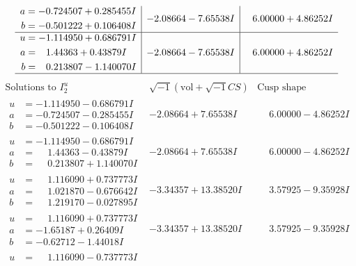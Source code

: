 \documentclass[1p]{elsarticle_modified}
\theoremstyle{definition}
\newcommand{\I}{\sqrt{-1}}
\begin{document}
$$\begin{array}{c|c|c}
\begin{aligned}
a &= -0.724507 + 0.285455 I \\
b &= -0.501222 + 0.106408 I\end{aligned}
 & -2.08664 - 7.65538 I & \phantom{-}6.00000 + 4.86252 I \\ \hline\begin{aligned}
u &= -1.114950 + 0.686791 I \\
a &= \phantom{-}1.44363 + 0.43879 I \\
b &= \phantom{-}0.213807 - 1.140070 I\end{aligned}
 & -2.08664 - 7.65538 I & \phantom{-}6.00000 + 4.86252 I\\
 \hline 
 \end{array}$$\newpage$$\begin{array}{c|c|c}  
\text{Solutions to }I^u_{2}& \I (\text{vol} + \sqrt{-1}CS) & \text{Cusp shape}\\
 \hline 
\begin{aligned}
u &= -1.114950 - 0.686791 I \\
a &= -0.724507 - 0.285455 I \\
b &= -0.501222 - 0.106408 I\end{aligned}
 & -2.08664 + 7.65538 I & \phantom{-}6.00000 - 4.86252 I \\ \hline\begin{aligned}
u &= -1.114950 - 0.686791 I \\
a &= \phantom{-}1.44363 - 0.43879 I \\
b &= \phantom{-}0.213807 + 1.140070 I\end{aligned}
 & -2.08664 + 7.65538 I & \phantom{-}6.00000 - 4.86252 I \\ \hline\begin{aligned}
u &= \phantom{-}1.116090 + 0.737773 I \\
a &= \phantom{-}1.021870 - 0.676642 I \\
b &= \phantom{-}1.219170 - 0.027895 I\end{aligned}
 & -3.34357 + 13.38520 I & \phantom{-}3.57925 - 9.35928 I \\ \hline\begin{aligned}
u &= \phantom{-}1.116090 + 0.737773 I \\
a &= -1.65187 + 0.26409 I \\
b &= -0.62712 - 1.44018 I\end{aligned}
 & -3.34357 + 13.38520 I & \phantom{-}3.57925 - 9.35928 I \\ \hline\begin{aligned}
u &= \phantom{-}1.116090 - 0.737773 I \\

\end{aligned}
\end{array}$$
\end{document}
